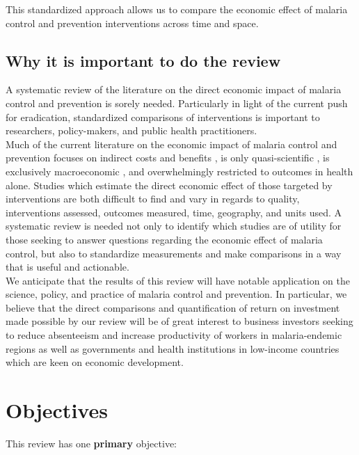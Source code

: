 \documentclass{article}
\begin{document}
\noindent This standardized approach allows us to compare the economic effect of malaria control and prevention interventions across time and space.


\subsection*{Why it is important to do the review}

A systematic review of the literature on the direct economic impact of malaria control and prevention is sorely needed. Particularly in light of the current push for eradication, standardized comparisons of interventions is important to researchers, policy-makers, and public health practitioners. \\

\noindent Much of the current literature on the economic impact of malaria control and prevention focuses on indirect costs and benefits \cite{Gallup1998}, is only quasi-scientific \cite{rbm2011}, is exclusively macroeconomic \cite{Hsiao2015} \cite{Zafar2007} \cite{Carstensen2006}, and overwhelmingly restricted to outcomes in health alone. Studies which estimate the direct economic effect of those targeted by interventions are both difficult to find and vary in regards to quality, interventions assessed,  outcomes measured, time, geography, and units used. A systematic review is needed not only to identify which studies are of utility for those seeking to answer questions regarding the economic effect of malaria control, but also to standardize measurements and make comparisons in a way that is useful and actionable. \\

\noindent We anticipate that the results of this review will have notable application on the science, policy, and practice of malaria control and prevention. In particular, we believe that the direct comparisons and quantification of return on investment made possible by our review will be of great interest to business investors seeking to reduce absenteeism and increase productivity of workers in malaria-endemic regions as well as governments and health institutions in low-income countries which are keen on economic development. 



\section*{Objectives}

This review has one \textbf{primary} objective: \\ 
\end{document}

